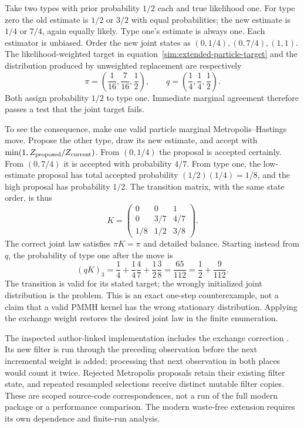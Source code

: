 Take two types with prior probability $1/2$ each and true likelihood one.
For type zero the old estimate is $1/2$ or $3/2$ with equal probabilities;
the new estimate is $1/4$ or $7/4$, again equally likely. Type one's estimate
is always one. Each estimator is unbiased. Order the new joint states as
$(0,1/4),(0,7/4),(1,1)$. The likelihood-weighted target in
equation~\eqref{sim:extended-particle-target} and the distribution produced by
unweighted replacement are respectively
\begin{equation}
 \pi=\left(\frac1{16},\frac7{16},\frac12\right),\qquad
 q=\left(\frac14,\frac14,\frac12\right).
\end{equation}
Both assign probability $1/2$ to type one. Immediate marginal agreement
therefore passes a test that the joint target fails.

To see the consequence, make one valid particle marginal Metropolis--Hastings
move. Propose the other type, draw its new estimate, and accept with
$\min(1,Z_{\rm proposed}/Z_{\rm current})$. From $(0,1/4)$ the proposal is
accepted certainly. From $(0,7/4)$ it is accepted with probability $4/7$.
From type one, the low-estimate proposal has total accepted probability
$(1/2)(1/4)=1/8$, and the high proposal has probability $1/2$. The transition
matrix, with the same state order, is thus
\begin{equation}
 K=\begin{pmatrix}
 0&0&1\\
 0&3/7&4/7\\
 1/8&1/2&3/8
 \end{pmatrix}.
\end{equation}
The correct joint law satisfies $\pi K=\pi$ and detailed balance. Starting
instead from $q$, the probability of type one after the move is
\begin{equation}
 (qK)_3=\frac14+\frac14\frac47+\frac12\frac38
       =\frac{65}{112}
       =\frac12+\frac9{112}.
\end{equation}
The transition is valid for its stated target; the wrongly initialized joint
distribution is the problem. This is an exact one-step counterexample, not a
claim that a valid PMMH kernel has the wrong stationary distribution. Applying
the exchange weight restores the desired joint law in the finite enumeration.

The inspected author-linked implementation includes the exchange
correction \citep[\texttt{SMC2.exchange\_step}, pinned source]{particlesgap2026}.
Its new filter is run through the preceding observation before
the next incremental weight is added; processing that next observation in
both places would count it twice. Rejected Metropolis proposals retain their
existing filter state, and repeated resampled selections receive distinct
mutable filter copies. These are scoped source-code correspondences, not a
run of the full modern package or a performance comparison. The modern
waste-free extension requires its own dependence and finite-run analysis.

